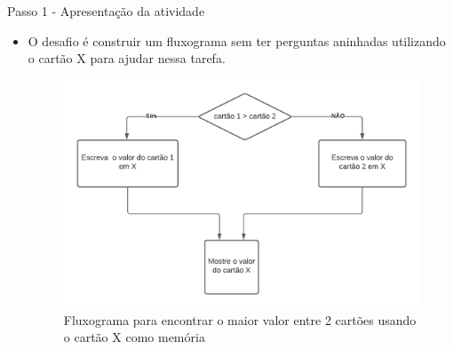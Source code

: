 \documentclass{beamer}
\begin{document}



\begin{frame}{Passo 1 - Apresentação da atividade}

\begin{itemize}
    \item O desafio é construir um fluxograma sem ter perguntas aninhadas utilizando o cartão X para ajudar nessa tarefa.
    
\begin{figure}
\begin{center}
	\includegraphics[scale=0.5]{images/fluxograma3.png} 
\end{center}
\caption{Fluxograma para encontrar o maior valor entre 2 cartões usando o cartão X como memória}
\end{figure}

 
    

\end{itemize}



\end{frame}

\end{document}

